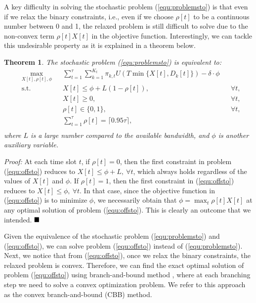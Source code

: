 \documentclass[10pt,journal,compsoc]{IEEEtran}
\newtheorem{theorem}{Theorem}
\begin{document}
A key difficulty in solving the stochastic problem (\ref{equ:problemsto}) is that even if we relax the binary constraints, i.e., even if we choose $\rho[t]$ to be a continuous number between 0 and 1, the relaxed problem is still difficult to solve due to the non-convex term $\rho[t]X[t]$ in the objective function. Interestingly, we can tackle this undesirable property  as it is explained in a theorem below.

\vspace{0.1cm}
\begin{theorem} \label{theorem3}
 The stochastic problem (\ref{equ:problemsto}) is equivalent to: 
\begin{equation}\label{equ:offsto}
\begin{aligned}
& \underset{X[t],\rho[t],\phi}{\text{max}}
& &\sum_{t=1}^{\tau} {\sum_{k=1}^{K_{t}} {\pi_{k,t} U(T\min\{X[t],D_k[t]\})}}-\delta \cdot \phi\\
& \text{s.t.}
& & X[t]\leq \phi+L(1-\rho[t]), && \forall t, \\
&&& X[t] \geq 0, && \forall t, \\
&&& \rho[t] \in \{0,1\}, &&  \forall t, \\
&&& \sum_{t=1}^{\tau} {\rho[t]}=\lceil0.95\tau\rceil, \\
\end{aligned}
\end{equation}
where $L$ is a large number compared to the available bandwidth, and $\phi$ is another auxiliary variable.
\end{theorem}

\vspace{0.1cm}



\emph{Proof:} At each time slot $t$, if $\rho[t] = 0$, then the first constraint in problem (\ref{equ:offsto}) reduces to $X[t] \leq \phi + L, \ \forall t$, which always holds regardless of the values of $X[t]$ and $\phi$. If $\rho[t] = 1$, then the first constraint in (\ref{equ:offsto}) reduces to $X[t] \leq \phi, \ \forall t$. In that case, since the objective function in (\ref{equ:offsto}) is to minimize $\phi$, we necessarily obtain that  $\phi = \max_t\rho[t]X[t]$ at any optimal solution of problem (\ref{equ:offsto}). This is clearly an outcome that we intended.  $\hfill \blacksquare$



\vspace{0.2cm}

Given the equivalence of the stochastic problem (\ref{equ:problemsto}) and (\ref{equ:offsto}), we can solve problem (\ref{equ:offsto}) instead of (\ref{equ:problemsto}). 
Next, we notice that  from (\ref{equ:offsto}), once we relax the binary constraints, the relaxed problem is convex. Therefore, we can find the exact optimal solution of problem (\ref{equ:offsto}) using branch-and-bound method \cite{Lawler1966}, where at each branching step we need to solve a convex optimization problem. We refer to this approach as the convex branch-and-bound (CBB) method.
\end{document}
